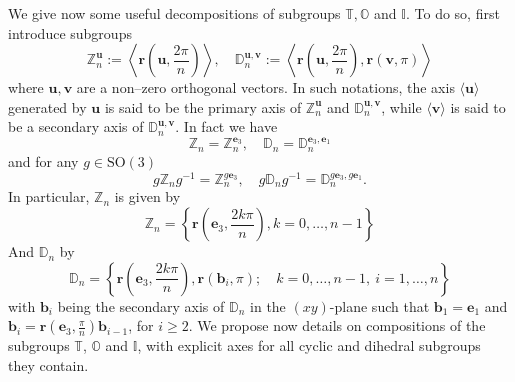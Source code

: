 \documentclass[11pt,a4paper]{amsart}
\theoremstyle{definition}
\newcommand{\ZZ}{\mathbb{Z}}                %
\newcommand{\SO}{\mathrm{SO}}               %
\newcommand{\octa}{\mathbb{O}}              %
\newcommand{\ico}{\mathbb{I}}               %
\newcommand{\tetra}{\mathbb{T}}             %
\newcommand{\DD}{\mathbb{D}}                %
\newcommand{\1}{\mathds{1}}		            %
\newcommand{\ee}{\pmb{e}}                   %
\newcommand{\uu}{\pmb{u}}                   %
\newcommand{\vv}{\pmb{v}}                   %
\newcommand{\vR}{\mathbf{r}}
\newcommand{\bb}{\mathbf{b}}
\newcommand{\set}[1]{\left\{#1\right\}}     %
\begin{document}
We give now some useful decompositions of subgroups $\tetra,\octa$ and $\ico$. To do so, first introduce subgroups
\begin{equation}\label{eq:AxesZnDn}
  \ZZ_n^{\uu}:=\left\langle \vR\left(\uu,\frac{2\pi}{n}\right)\right\rangle,\quad \DD_n^{\uu,\vv}:=\left\langle \vR\left(\uu,\frac{2\pi}{n}\right),\vR(\vv,\pi)\right\rangle
\end{equation}
where $\uu,\vv$ are a non--zero orthogonal vectors. In such notations, the axis $\langle\uu\rangle$ generated by $\uu$ is said to be the primary axis of $\ZZ_n^{\uu}$ and $\DD_n^{\uu,\vv}$, while $\langle\vv\rangle$ is said to be a secondary axis of $\DD_n^{\uu,\vv}$. In fact we have
\begin{equation*}
  \ZZ_n=\ZZ_n^{\ee_3},\quad \DD_n=\DD_n^{\ee_3,\ee_1}
\end{equation*}
and for any $g\in \SO(3)$
\begin{equation*}
  g\ZZ_ng^{-1}=\ZZ_n^{g\ee_3},\quad g\DD_ng^{-1}=\DD_n^{g\ee_3,g\ee_1}.
\end{equation*}
In particular, $\ZZ_n$ is given by
\begin{equation}\label{eq:Zn}
\ZZ_n=\set{\vR\left(\ee_3,\frac{2k\pi}{n}\right),k=0,\dotsc,n-1}
\end{equation}
And $\DD_n$ by
\begin{equation}\label{eq:Dn}
\DD_n=\set{\vR\left(\ee_3,\frac{2k\pi}{n}\right),\vR(\bb_{i},\pi);\quad k=0,\dotsc,n-1,\ i=1,\dotsc,n}
\end{equation}
with $\bb_i$ being the secondary axis of $\DD_n$ in the $(xy)$-plane such that $\bb_1=\ee_1$ and $\bb_i=\vR\left(\ee_3,\frac{\pi}{n}\right)\bb_{i-1}$, for $i\geq2$.
We propose now details on compositions of the subgroups $\tetra$, $\octa$ and $\ico$, with explicit axes for all cyclic and dihedral subgroups they contain.
\end{document}

